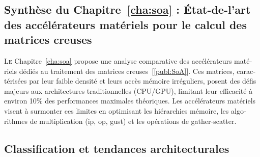 \begin{otherlanguage}{french}

\addtocounter{synthFCnt}{1}
\section{Synthèse du Chapitre~\ref{cha:soa} : \'Etat-de-l'art des accélérateurs matériels pour le calcul des matrices creuses}

\lettrine{L}{e} Chapitre~\ref{cha:soa} propose une analyse comparative des accélérateurs matériels dédiés au traitement des matrices creuses~[\ref{publ:SoA}].
Ces matrices, caractérisées par leur faible densité et leurs accès mémoire irréguliers, posent des défis majeurs aux architectures traditionnelles (CPU/GPU), limitant leur efficacité à environ 10\% des performances maximales théoriques.
Les accélérateurs matériels visent à surmonter ces limites en optimisant les hiérarchies mémoire, les algorithmes de multiplication (\acrlong{ip}, \acrlong{op}, \acrlong{gust}) et les opérations de \gls{gather}-\gls{scatter}.

\subsection*{Classification et tendances architecturales}


\end{otherlanguage}
